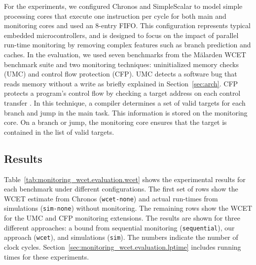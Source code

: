 
For the experiments, we configured Chronos and SimpleScalar to model simple processing cores
that execute one instruction per cycle for both main and monitoring cores and used an 8-entry FIFO.
This configuration represents typical embedded microcontrollers, and is designed to focus on 
the impact of parallel run-time monitoring by removing complex features such as branch prediction 
and caches.
In the evaluation, we used seven benchmarks from the M\"alarden WCET benchmark suite \cite{malarden} 
and two monitoring techniques: uninitialized memory checks (UMC) and control flow protection (CFP).
UMC detects a software bug that reads memory without a write as briefly explained in 
Section~\ref{sec:arch}. CFP protects a program's control flow by checking a target address on
each control transfer \cite{arora-runtime05}. In this technique, a compiler determines a set of valid
targets for each branch and jump in the main task.
This information is stored on the monitoring core. 
On a branch or jump, the monitoring core ensures that the target is
contained in the list of valid targets.

\subsection{Results}

Table~\ref{tab:monitoring_wcet.evaluation.wcet} shows the experimental results for each
benchmark under different configurations. The first set of rows show the WCET 
estimate from Chronos ({\tt wcet-none}) and actual run-times from simulations ({\tt sim-none}) without 
monitoring. The remaining rows show the WCET for the UMC and
CFP monitoring extensions. The results are shown for three different approaches:
a bound from sequential monitoring ({\tt sequential}), our approach ({\tt wcet}),
and simulations ({\tt sim}). The numbers indicate the number of clock cycles.
Section~\ref{sec:monitoring_wcet.evaluation.lptime} includes running times for these experiments.

